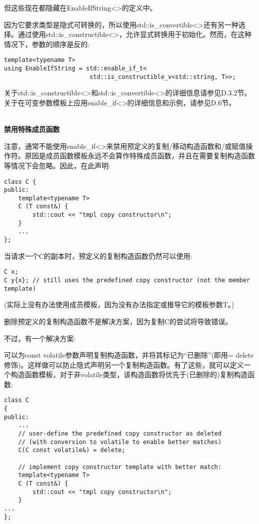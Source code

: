 但这些现在都隐藏在EnableIfString<>的定义中。

因为它要求类型是隐式可转换的，所以使用std::is\_convertible<>还有另一种选择。通过使用std::is\_constructible<>，允许显式转换用于初始化。然而，在这种情况下，参数的顺序是反的:

\begin{lstlisting}[style=styleCXX]
template<typename T>
using EnableIfString = std::enable_if_t<
						std::is_constructible_v<std::string, T>>;
\end{lstlisting}

关于std::is\_constructible<>和std::is\_convertible<>的详细信息请参见D.3.2节。关于在可变参数模板上应用enable\_if<>的详细信息和示例，请参见D.6节。

\hspace*{\fill} \\ %
\noindent
\textbf{禁用特殊成员函数}

注意，通常不能使用enable\_if<>来禁用预定义的复制/移动构造函数和/或赋值操作符。原因是成员函数模板永远不会算作特殊成员函数，并且在需要复制构造函数等情况下会忽略。因此，在此声明:

\begin{lstlisting}[style=styleCXX]
class C {
public:
	template<typename T>
	C (T const&) {
		std::cout << "tmpl copy constructor\n";
	}
	...
};
\end{lstlisting}

当请求一个C的副本时，预定义的复制构造函数仍然可以使用:

\begin{lstlisting}[style=styleCXX]
C x;
C y{x}; // still uses the predefined copy constructor (not the member template)
\end{lstlisting}

(实际上没有办法使用成员模板，因为没有办法指定或推导它的模板参数T。)

删除预定义的复制构造函数不是解决方案，因为复制C的尝试将导致错误。

不过，有一个解决方案:

可以为const volatile参数声明复制构造函数，并将其标记为“已删除”(即用= delete修饰)。这样做可以防止隐式声明另一个复制构造函数。有了这些，就可以定义一个构造函数模板，对于非volatile类型，该构造函数将优先于(已删除的)复制构造函数:

\begin{lstlisting}[style=styleCXX]
class C
{
public:
	...
	// user-define the predefined copy constructor as deleted
	// (with conversion to volatile to enable better matches)
	C(C const volatile&) = delete;
	
	// implement copy constructor template with better match:
	template<typename T>
	C (T const&) {
		std::cout << "tmpl copy constructor\n";
	}
...
};
\end{lstlisting}

